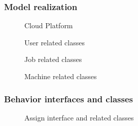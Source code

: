 \subsubsection{Model realization}
\begin{figure}[htbp]
	\centering
	\tiny
	\begin{tikzpicture}
	
	\end{tikzpicture}
	\caption{Cloud Platform}
	\label{fig:platform}
\end{figure}
\begin{figure}[htbp]
    \centering
    \tiny
    \begin{tikzpicture}
    
    

    \end{tikzpicture}
    \caption{User related classes}
    \label{fig:userclassed}
\end{figure}
\begin{figure}[htbp]
    \centering
    \tiny
    \begin{tikzpicture}
    
    
    
    \end{tikzpicture}
    \caption{Job related classes}
    \label{fig:jobclassed}
\end{figure}
\begin{figure}[htbp]
    \centering
    \tiny
    \begin{tikzpicture}
    
    
    
    \end{tikzpicture}
    \caption{Machine related classes}
    \label{fig:machineclassed}
\end{figure}

\subsubsection{Behavior interfaces and classes}
\begin{figure}[htbp]
    \centering
    \tiny
    \begin{tikzpicture}
    
    
    
    
    
    \end{tikzpicture}
    \caption{Assign interface and related classes}
    \label{fig:assigninterface}
\end{figure}

